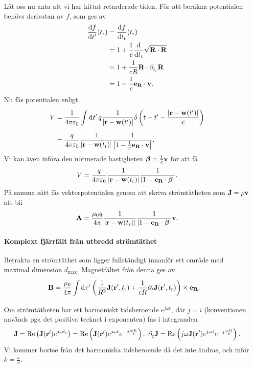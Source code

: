 Låt oss nu anta att vi har hittat retarderade tiden. För att beräkna potentialen behövs derivatan av $f$, som ges av
\begin{align*}
	\dv{f}{t'}\/(t_{\text{r}}) &= \dv{f}{t_{\text{r}}}\/(t_{\text{r}}) \\
	                          &= 1 + \frac{1}{c}\dv{t_{\text{r}}}\sqrt{\vb{R}\cdot\vb{R}} \\
	                          &= 1 + \frac{1}{cR}\vb{R}\cdot\partial_{t_{\text{r}}}^{}\vb{R} \\
	                          &= 1 - \frac{1}{c}\vb{e}_{\vb{R}}\cdot\vb{v}.
\end{align*}
Nu fås potentialen enligt
\begin{align*}
	V &= \frac{1}{4\pi\varepsilon_{0}}\int\limits_{}^{}\dd[]{t'}q\frac{1}{\abs{\vb{r} - \vb{w}(t')}}\delta\left(t - t' - \frac{\abs{\vb{r} - \vb{w}(t')}}{c}\right) \\
	  &= \frac{q}{4\pi\varepsilon_{0}}\frac{1}{\abs{\vb{r} - \vb{w}(t_{\text{r}})}}\frac{1}{\abs{1 - \frac{1}{c}\vb{e}_{\vb{R}}\cdot\vb{v}}}.
\end{align*}
Vi kan även införa den normerade hastigheten $\vb*{\beta} = \frac{1}{c}\vb{v}$ för att få
\begin{align*}
	V = \frac{q}{4\pi\varepsilon_{0}}\frac{1}{\abs{\vb{r} - \vb{w}(t_{\text{r}})}}\frac{1}{\abs{1 - \vb{e}_{\vb{R}}\cdot\vb*{\beta}}}.
\end{align*}
På samma sätt fås vektorpotentialen genom att skriva strömtätheten som $\vb{J} = \rho\vb{v}$ att bli
\begin{align*}
	\vb{A} = \frac{\mu_{0}q}{4\pi}\frac{1}{\abs{\vb{r} - \vb{w}(t_{\text{r}})}}\frac{1}{\abs{1 - \vb{e}_{\vb{R}}\cdot\vb*{\beta}}}\vb{v}.
\end{align*}

\paragraph{Komplext fjärrfält från utbredd strömtäthet}
Betrakta en strömtäthet som ligger fullständigt innanför ett område med maximal dimension $d_{\text{max}}$. Magnetfältet från denna ges av
\begin{align*}
	\vb{B} &= \frac{\mu_{0}}{4\pi}\int\limits_{}^{}\dd[]{\tau'}\left(\frac{1}{R^{2}}\vb{J}(\vb{r}', t_{\text{r}}) + \frac{1}{cR}\partial_{t}^{}\vb{J}(\vb{r}', t_{\text{r}})\right)\times\vb{e}_{\vb{R}}.
\end{align*}
Om strömtätheten har ett harmoniskt tidsberoende $e^{j\omega t}$, där $j = i$ (konventionen används pga det positiva tecknet i exponenten) fås i integranden
\begin{align*}
	\vb{J} = \Re\left(\vb{J}(\vb{r}')e^{j\omega t_{\text{r}}}\right) = \Re\left(\vb{J}(\vb{r}')e^{j\omega t}e^{-j\frac{\omega R}{c}}\right),\ \del{t}{\vb{J}} = \Re\left(j\omega\vb{J}(\vb{r}')e^{j\omega t}e^{-j\frac{\omega R}{c}}\right).
\end{align*}
Vi kommer bortse från det harmoniska tidsberoende då det inte ändras, och inför $k = \frac{\omega}{c}$.

